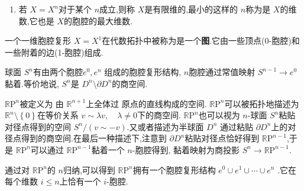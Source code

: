\documentclass[../../几何与拓扑.tex]{subfiles}
\begin{document}
\begin{remark}
    \begin{enumerate}
        \item 若 \(  X =  X^{n}  \)对于某个 \(  n  \)成立,则称 \(  X  \)是有限维的,最小的这样的 \(  n  \)称为是 \(  X  \)的维数,它也是 \(  X  \)的胞腔的最大维数.      
    \end{enumerate}
    
\end{remark}

\begin{example}
    一个一维胞腔复形 \(  X= X^{1}  \)在代数拓扑中被称为是一个\textbf{图}.它由一些顶点(0-胞腔)和一些附着的边(1-胞腔)组成. 
\end{example}

\hspace*{\fill} 

\begin{example}
    球面 \(  S^{n}  \)有由两个胞腔\(  e^{0},e^{n}  \) 组成的胞腔复形结构, \(  n  \)胞腔通过常值映射 \(  S^{n-1}\to e^{0}  \)黏着.等价地说, \(  S^{n}  \)是 \(  D^{n}\setminus  \partial D^{n}  \)的商空间.    
\end{example}

\hspace*{\fill} 

\begin{example}[实射影空间]
    \(  \mathbb{R} \mathrm{P}^{n}  \)被定义为 由 \(  \mathbb{R} ^{n+ 1}  \)上全体过 原点的直线构成的空间. \(  \mathbb{R} \mathrm{P}^{n}  \)可以被拓扑地描述为 \(  \mathbb{R} ^{n}\setminus \left\{ 0 \right\}  \)在等价关系 \(  v\sim  \lambda v,\quad  \lambda \neq 0  \)下的商空间. \(  \mathbb{R} \mathrm{P}^{n}  \)也可以视为 \(  n  \)-球面 \(  S^{n}  \)粘贴对径点得到的空间 \(  S^{n} / \left( v\sim -v \right)   \).又或者描述为半球面 \(  D^{n}  \)   通过粘贴 \(   \partial D^{n}  \)上的对径点得到的商空间.在最后一种描述下,注意到 \(   \partial D^{n}  \)粘贴对径点恰好得到 \(  \mathbb{R} \mathrm{P}^{n-1}  \),于是 \(  \mathbb{R} \mathrm{P}^{n}  \)可以通过 \(  \mathbb{R} \mathrm{P}^{n-1}  \)黏着一个 \(  n  \)-胞腔得到,  黏着映射为商投影 \(  S^{n}\to \mathbb{R} \mathrm{P}^{n-1}  \).
    
    通过对 \(  \mathbb{R} \mathrm{P}^{n}  \)的 \(  n  \)归纳,可以得到 \(  \mathbb{R} \mathrm{P}^{n}  \)拥有一个胞腔复形结构 \(  e^{0}\cup e^{1}\cup \cdots \cup e^{n}  \)    .它在每个维数 \(  i\le n  \)上恰有一个 \(  i  \)-胞腔.  
\end{example}

\hspace*{\fill} 
\end{document}
